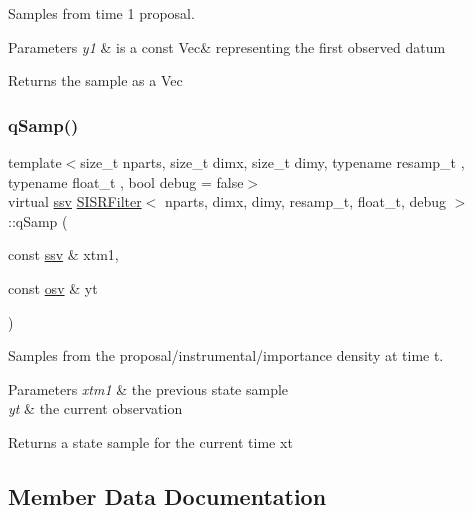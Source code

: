 Samples from time 1 proposal. 


\begin{DoxyParams}{Parameters}
{\em y1} & is a const Vec\& representing the first observed datum \\
\hline
\end{DoxyParams}
\begin{DoxyReturn}{Returns}
the sample as a Vec 
\end{DoxyReturn}
\mbox{\label{classSISRFilter_ab953b6fae2c14128f5032854e0ffc62c}} 
\subsubsection{\texorpdfstring{q\+Samp()}{qSamp()}}
{\footnotesize\ttfamily template$<$size\+\_\+t nparts, size\+\_\+t dimx, size\+\_\+t dimy, typename resamp\+\_\+t , typename float\+\_\+t , bool debug = false$>$ \\
virtual \hyperlink{classSISRFilter_ada0fdfca451ed6a22a8bba48a881819d}{ssv} \hyperlink{classSISRFilter}{S\+I\+S\+R\+Filter}$<$ nparts, dimx, dimy, resamp\+\_\+t, float\+\_\+t, debug $>$\+::q\+Samp (\begin{DoxyParamCaption}\item[{const \hyperlink{classSISRFilter_ada0fdfca451ed6a22a8bba48a881819d}{ssv} \&}]{xtm1,  }\item[{const \hyperlink{classSISRFilter_a42325662bf3d057ccc3eaa75fa2f70f9}{osv} \&}]{yt }\end{DoxyParamCaption})\hspace{0.3cm}{\ttfamily [pure virtual]}}



Samples from the proposal/instrumental/importance density at time t. 


\begin{DoxyParams}{Parameters}
{\em xtm1} & the previous state sample \\
\hline
{\em yt} & the current observation \\
\hline
\end{DoxyParams}
\begin{DoxyReturn}{Returns}
a state sample for the current time xt 
\end{DoxyReturn}


\subsection{Member Data Documentation}
\mbox{\label{classSISRFilter_a9f5c7aae1c9abf3a1fc8ba371baa8450}} 
